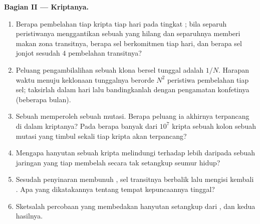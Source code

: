 \begin{problem}
\medskip
\noindent\textbf{Bagian II --- Kriptanya.}
\begin{enumerate}[resume]
  \item Berapa pembelahan tiap kripta tiap hari pada tingkat ; bila separuh
        peristiwanya menggantikan sebuah  yang hilang dan separuhnya memberi makan zona transitnya,
        berapa sel berkomitmen tiap hari, dan berapa sel jonjot sesudah
        $4$ pembelahan transitnya?
  \item Peluang pengambilalihan sebuah klona bersel tunggal adalah $1/N$. Harapan
        waktu menuju keklonaan tunggalnya berorde $N^{2}$ peristiwa pembelahan tiap
        sel; taksirlah dalam hari lalu bandingkanlah dengan pengamatan
        konfetinya (beberapa bulan).
  \item Sebuah  memperoleh sebuah mutasi. Berapa peluang ia akhirnya
        terpancang di dalam kriptanya? Pada berapa banyak dari $10^{7}$ kripta sebuah
        kolon sebuah mutasi yang timbul sekali tiap kripta akan terpancang?
  \item Mengapa hanyutan sebuah kripta melindungi terhadap  lebih daripada sebuah
        jaringan yang tiap  membelah secara tak setangkup seumur hidup?
  \item Sesudah penyinaran membunuh , sel transitnya berbalik
        lalu mengisi kembali . Apa yang dikatakannya tentang tempat kepuncaannya
        tinggal?
  \item Sketsalah percobaan  yang membedakan
        hanyutan setangkup dari , dan kedua hasilnya.
\end{enumerate}


\end{problem}
